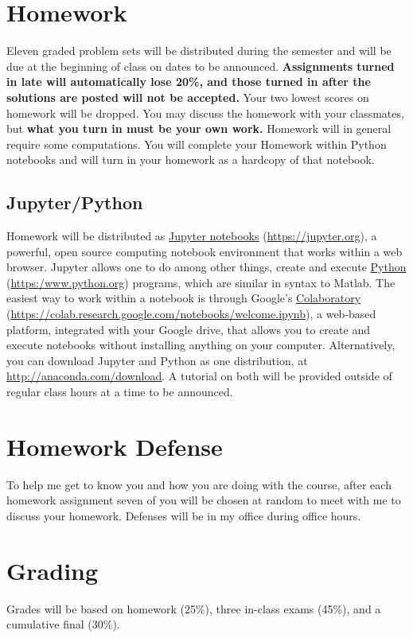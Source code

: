 \documentclass[11pt]{article}
\begin{document}
\section{Homework}
\label{sec:orgeaee397}
Eleven graded problem sets will be distributed during the semester and will be due at the beginning of class on dates to be announced.  \textbf{Assignments turned in late will automatically lose 20\%, and those turned in after the solutions are posted will not be accepted.}  Your two lowest scores on homework will be dropped.  You may discuss the homework with your classmates, but \textbf{what you turn in must be your own work.} Homework will in general require some computations. You will complete your Homework within Python notebooks and will turn in your homework as a hardcopy of that notebook.

\subsection{Jupyter/Python}
\label{sec:org913ab7c}
Homework will be distributed as \href{https://jupyter.org/}{Jupyter notebooks} (\url{https://jupyter.org}), a powerful, open source computing notebook environment that works within a web browser. Jupyter allows one to do among other things, create and execute \href{https://www.python.org/}{Python} (\url{https:/www.python.org}) programs, which are similar in syntax to Matlab. The easiest way to work within a notebook is through Google's \href{https://colab.research.google.com/notebooks/welcome.ipynb}{Colaboratory} (\url{https://colab.research.google.com/notebooks/welcome.ipynb}), a web-based platform, integrated with your Google drive, that allows you to create and execute notebooks without installing anything on your computer. Alternatively, you can download Jupyter and Python as one distribution, at \url{http://anaconda.com/download}. A tutorial on both will be provided outside of regular class hours at a time to be announced.
\section{Homework Defense}
\label{sec:org52119a7}
To help me get to know you and how you are doing with the course, after each homework assignment seven of you will be chosen at random to meet with me to discuss your homework. Defenses will be in my office during office hours.

\section{Grading}
\label{sec:orgca466a5}
Grades will be based on homework (25\%), three in-class exams (45\%), and a cumulative final (30\%).
\end{document}
